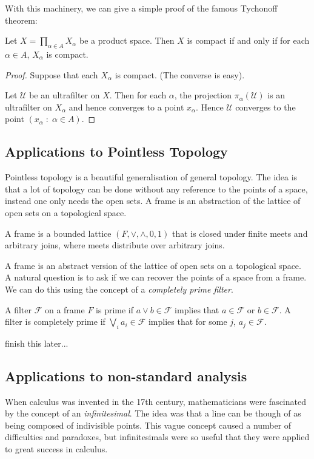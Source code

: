 With this machinery, we can give a simple proof of the famous Tychonoff theorem:
\begin{theorem}
    Let $X = \prod_{\alpha \in A} X_\alpha$ be a product space. Then $X$
    is compact if and only if for each $\alpha \in A$, $X_\alpha$ is compact.
\end{theorem}
\begin{proof}
    Suppose that each $X_\alpha$ is compact. (The converse is easy).

    Let $\mathcal{U}$ be an ultrafilter on $X$. Then for each $\alpha$,
    the projection $\pi_\alpha(\mathcal{U})$ is an ultrafilter on $X_\alpha$
    and hence converges to a point $x_\alpha$. Hence $\mathcal{U}$
    converges to the point $(x_\alpha\;:\;\alpha\in A)$.
\end{proof}

\subsection{Applications to Pointless Topology}

Pointless topology is a beautiful generalisation of general topology. The idea
is that a lot of topology can be done without any reference to the points
of a space, instead one only needs the open sets. A frame is an abstraction
of the lattice of open sets on a topological space.
\begin{definition}
    A frame is a bounded lattice $(F,\vee,\wedge,0,1)$ that is closed under finite meets
    and arbitrary joins, where meets distribute over arbitrary joins.
\end{definition}
A frame is an abstract version of the lattice of open sets on a topological space.
A natural question is to ask if we can recover the points of a space from a frame.
We can do this using the concept of a \emph{completely prime filter}.
\begin{definition}
    A filter $\mathcal{F}$ on a frame $F$ is prime if $a \vee b \in \mathcal{F}$
    implies that $a \in \mathcal{F}$ or $b \in \mathcal{F}$. A filter
    is completely prime if $\bigvee_{i} a_i \in \mathcal{F}$ implies that for some $j$,
    $a_j \in \mathcal{F}$.
\end{definition}
finish this later...


\subsection{Applications to non-standard analysis}
When calculus was invented in the 17th century, mathematicians were
fascinated by the concept of an \emph{infinitesimal}. The idea 
was that a line can be though of as being composed of indivisible points. This
vague concept
caused a number of difficulties and paradoxes, but infinitesimals were so useful
that they were applied to great success in calculus. 

